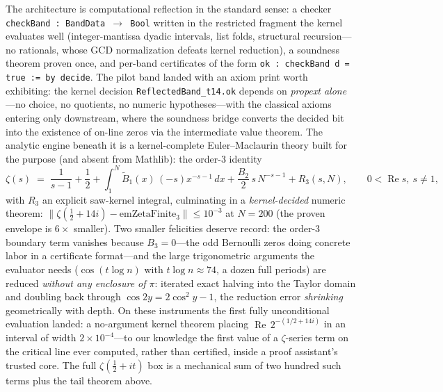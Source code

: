 The architecture is computational reflection in the standard sense: a
checker \texttt{checkBand : BandData $\to$ Bool} written in the restricted
fragment the kernel evaluates well (integer-mantissa dyadic intervals, list
folds, structural recursion---no rationals, whose GCD normalization defeats
kernel reduction), a soundness theorem proven once, and per-band certificates
of the form \texttt{ok : checkBand d = true := by decide}. The pilot band
landed with an axiom print worth exhibiting: the kernel decision
\texttt{ReflectedBand\_t14.ok} depends on \emph{propext alone}---no choice,
no quotients, no numeric hypotheses---with the classical axioms entering only
downstream, where the soundness bridge converts the decided bit into the
existence of on-line zeros via the intermediate value theorem. The analytic
engine beneath it is a kernel-complete Euler--Maclaurin theory built for the
purpose (and absent from Mathlib): the order-3 identity
\[
  \zeta(s) \;=\; \frac{1}{s-1} + \frac12
  + \int_1^N \widetilde{B}_1(x)\,(-s)x^{-s-1}\,dx
  + \frac{B_2}{2}\,s\,N^{-s-1} + R_3(s,N),
  \qquad 0 < \operatorname{Re} s,\ s \ne 1,
\]
with $R_3$ an explicit saw-kernel integral, culminating in a
\emph{kernel-decided} numeric theorem:
$\lVert \zeta(\tfrac12 + 14i) - \mathrm{emZetaFinite}_3 \rVert \le 10^{-3}$
at $N = 200$ (the proven envelope is $6\times$ smaller). Two smaller
felicities deserve record: the order-3 boundary term vanishes because
$B_3 = 0$---the odd Bernoulli zeros doing concrete labor in a certificate
format---and the large trigonometric arguments the evaluator needs
($\cos(t\log n)$ with $t\log n \approx 74$, a dozen full periods) are reduced
\emph{without any enclosure of $\pi$}: iterated exact halving into the Taylor
domain and doubling back through $\cos 2y = 2\cos^2 y - 1$, the reduction
error \emph{shrinking} geometrically with depth. On these instruments the
first fully unconditional evaluation landed: a no-argument kernel theorem
placing $\operatorname{Re}\, 2^{-(1/2+14i)}$ in an interval of width
$2\times10^{-4}$---to our knowledge the first value of a $\zeta$-series term
on the critical line ever computed, rather than certified, inside a proof
assistant's trusted core. The full $\zeta(\tfrac12+it)$ box is a mechanical
sum of two hundred such terms plus the tail theorem above.

